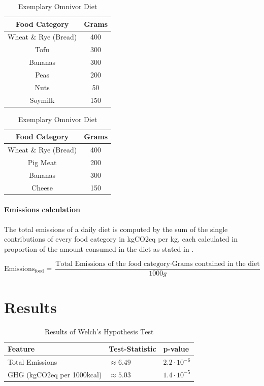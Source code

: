 \documentclass{article}
\begin{document}
\begin{table}[h]
\parbox{.45\linewidth}{
  \caption{Exemplary Plant-based  Diet}
\centering
\begin{tabular}{c c}
\toprule
Food Category & Grams\\
\midrule
Wheat \& Rye (Bread) & 400\\
Tofu & 300\\
Bananas & 300\\
Peas & 200\\
Nuts & 50\\
Soymilk & 150\\
\bottomrule
\end{tabular}
\label{tbl:plantdiet}
}
\hfill
\parbox{.45\linewidth}{
  \caption{Exemplary Omnivor  Diet}
\centering
\begin{tabular}{c c}
\toprule
Food Category & Grams\\
\midrule
Wheat \& Rye (Bread) & 400\\
Pig Meat & 200\\
Bananas & 300\\
Cheese & 150\\
\bottomrule
\end{tabular}
\label{tbl:omnidiet}
}
\end{table}

\paragraph*{Emissions calculation} The total emissions of a daily diet is computed by the sum of the single contributions of every food category in kgCO2eq per kg, each calculated in proportion of the amount consumed in the diet as stated in .

\begin{equation}\label{eq:diet}
  \textrm{Emissions}_{\textrm{food}} = \frac{\textrm{Total Emissions of the food category} \cdot \textrm{Grams contained in the diet}}{1000g}
\end{equation}

\section{Results}
\label{sec:results}

\begin{table}[h]
  \caption{Results of  Welch's Hypothesis Test}
  \label{tbl:results-test}
  \centering
  \begin{tabular}{lll}
    \toprule
    Feature     & Test-Statistic   & p-value  \\
    \midrule
    Total Emissions &$\approx 6.49$  & $ 2.2\cdot10^{-6}  $  \\
    GHG (kgCO2eq per 1000kcal)    & $\approx 5.03 $  & $ 1.4\cdot10^{-5}$    \\
    \bottomrule
  \end{tabular}
\end{table}
\end{document}
